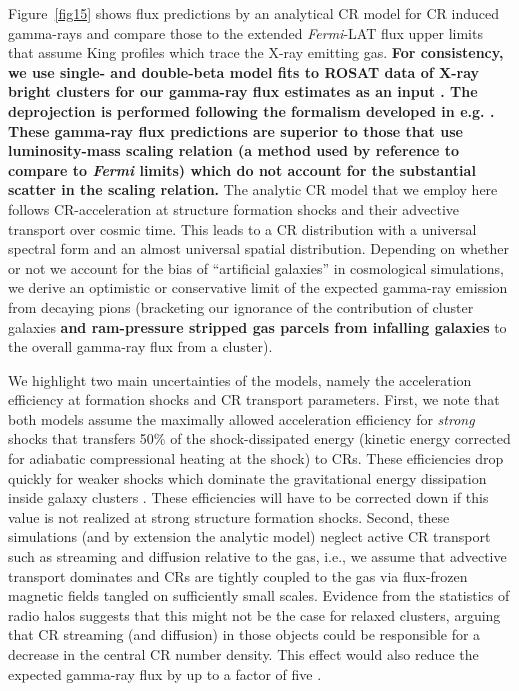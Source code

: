 \documentclass[10pt,aps,pra,reprint,amsmath,amsfonts,amssymb,showpacs,nofootinbib,floatfix]{revtex4-1}
\def\C#1{{\bf #1}}
\newcommand{\Fermi}{{\em Fermi}\xspace}
\begin{document}
Figure~\ref{fig15} shows flux predictions by an analytical CR model
\cite{2010MNRAS.409..449P} for CR induced gamma-rays and compare those
to the extended \Fermi-LAT flux upper limits that assume King profiles
which trace the X-ray emitting gas. \C{For consistency, we use single-
  and double-beta model fits to ROSAT data of X-ray bright clusters
  for our gamma-ray flux estimates as an input
  \cite{2007A&A...466..805C}. The deprojection is performed following
  the formalism developed in e.g. \cite{2004A&A...413...17P}. These
  gamma-ray flux predictions are superior to those that use
  luminosity-mass scaling relation (a method used by reference
  \cite{2010ApJ...717L..71A} to compare to \Fermi limits) which do not
  account for the substantial scatter in the scaling relation.}  The
analytic CR model that we employ here follows CR-acceleration at
structure formation shocks and their advective transport over cosmic
time. This leads to a CR distribution with a universal spectral form
and an almost universal spatial distribution. Depending on whether or
not we account for the bias of ``artificial galaxies'' in cosmological
simulations, we derive an optimistic or conservative limit of the
expected gamma-ray emission from decaying pions (bracketing our
ignorance of the contribution of cluster galaxies \C{and ram-pressure
  stripped gas parcels from infalling galaxies} to the overall
gamma-ray flux from a cluster).

We highlight two main uncertainties of the models, namely the
acceleration efficiency at formation shocks and CR transport
parameters. First, we note that both models assume the maximally
allowed acceleration efficiency for {\em strong} shocks that transfers
50\% of the shock-dissipated energy (kinetic energy corrected for
adiabatic compressional heating at the shock) to CRs. These
efficiencies drop quickly for weaker shocks \cite{2007A&A...473...41E}
which dominate the gravitational energy dissipation inside galaxy
clusters \cite{2006MNRAS.367..113P}. These efficiencies will have to
be corrected down if this value is not realized at strong structure formation
shocks. Second, these simulations (and by extension the analytic
model) neglect active CR transport such as streaming and diffusion
relative to the gas, i.e., we assume that advective transport
dominates and CRs are tightly coupled to the gas via flux-frozen
magnetic fields tangled on sufficiently small scales. Evidence from
the statistics of radio halos suggests that this might not be the case
for relaxed clusters, arguing that CR streaming (and diffusion) in
those objects could be responsible for a decrease in the central CR
number density. This effect would also reduce the expected gamma-ray
flux by up to a factor of five \cite{2011A&A...527A..99E}.
\end{document}
